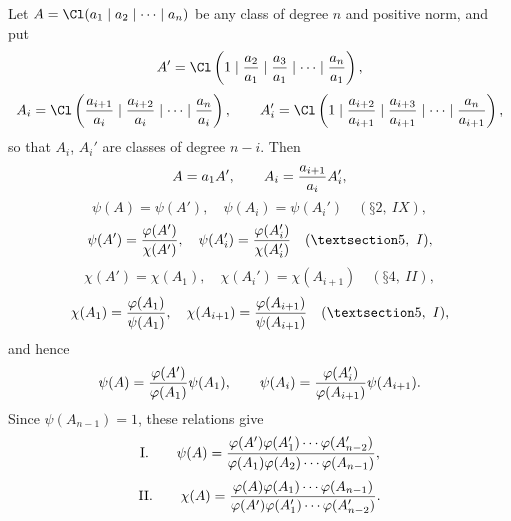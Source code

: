 Let $A=\Cl(a_1\mid a_2\mid\cdots\mid a_n)$ be any class of degree $n$ and positive norm, and put
\[
 A'=\Cl\left(1\mid {a_2\over a_1}\mid {a_3\over a_1}\mid\cdots\mid {a_n\over a_1}\right),
\]
\[
 A_i=\Cl\left({a_{i+1}\over a_i}\mid {a_{i+2}\over a_i}\mid\cdots\mid {a_n\over a_i}\right),
\qquad
 A_i'=\Cl\left(1\mid {a_{i+2}\over a_{i+1}}\mid {a_{i+3}\over a_{i+1}}\mid\cdots\mid {a_n\over a_{i+1}}\right),
\]
so that $A_i$, $A_i'$ are classes of degree $n-i$. Then
\[
 A=a_1A',\qquad A_i={a_{i+1}\over a_i}A_i',
\]
\[
 \psi(A)=\psi(A'),\quad \psi(A_i)=\psi(A_i')\quad (§ 2,\ IX),
\]
\[
 \psi(A')={\varphi(A')\over\chi(A')},\quad
 \psi(A_i')={\varphi(A_i')\over\chi(A_i')}\quad (§ 5,\ I),
\]
\[
 \chi(A')=\chi(A_1),\quad \chi(A_i')=\chi(A_{i+1})\quad (§ 4,\ II),
\]
\[
 \chi(A_1)={\varphi(A_1)\over\psi(A_1)},\quad
 \chi(A_{i+1})={\varphi(A_{i+1})\over\psi(A_{i+1})}\quad (§ 5,\ I),
\]
and hence
\[
 \psi(A)={\varphi(A')\over\varphi(A_1)}\psi(A_1),
 \qquad
 \psi(A_i)={\varphi(A_i')\over\varphi(A_{i+1})}\psi(A_{i+1}).
\]
Since $\psi(A_{n-1})=1$, these relations give
\[
\text{I.}\qquad
 \psi(A)={\varphi(A')\varphi(A_1')\cdots\varphi(A_{n-2}')
 \over
 \varphi(A_1)\varphi(A_2)\cdots\varphi(A_{n-1})},
\]
\[
\text{II.}\qquad
 \chi(A)={\varphi(A)\varphi(A_1)\cdots\varphi(A_{n-1})
 \over
 \varphi(A')\varphi(A_1')\cdots\varphi(A_{n-2}')}.
\]

